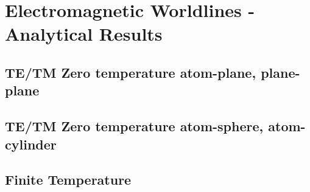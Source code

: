 \chapter{Electromagnetic Worldlines - Analytical Results}

 
    \section{TE/TM Zero temperature atom-plane, plane-plane}
    \section{TE/TM Zero temperature atom-sphere, atom-cylinder}
    \section{Finite Temperature}

